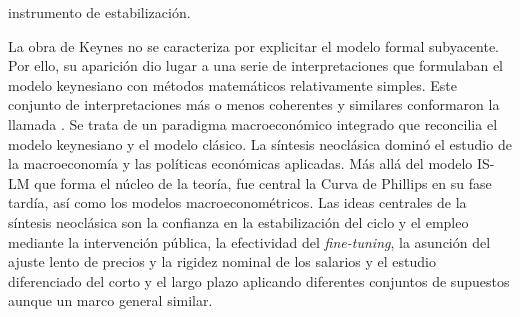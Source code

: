 \documentclass{nuevotema}
\begin{document}
instrumento de estabilización. 

La obra de Keynes no se caracteriza por explicitar el modelo formal subyacente. Por ello, su aparición dio lugar a una serie de interpretaciones que formulaban el modelo keynesiano con métodos matemáticos relativamente simples. Este conjunto de interpretaciones más o menos coherentes y similares conformaron la llamada . Se trata de un paradigma macroeconómico integrado que reconcilia el modelo keynesiano y el modelo clásico. La síntesis neoclásica dominó el estudio de la macroeconomía y las políticas económicas aplicadas. Más allá del modelo IS-LM que forma el núcleo de la teoría, fue central la Curva de Phillips en su fase tardía, así como los modelos macroeconométricos. Las ideas centrales de la síntesis neoclásica son la confianza en la estabilización del ciclo y el empleo mediante la intervención pública, la efectividad del \textit{fine-tuning}, la asunción del ajuste lento de precios y la rigidez nominal de los salarios y el estudio diferenciado del corto y el largo plazo aplicando diferentes conjuntos de supuestos aunque un marco general similar.
\end{document}
